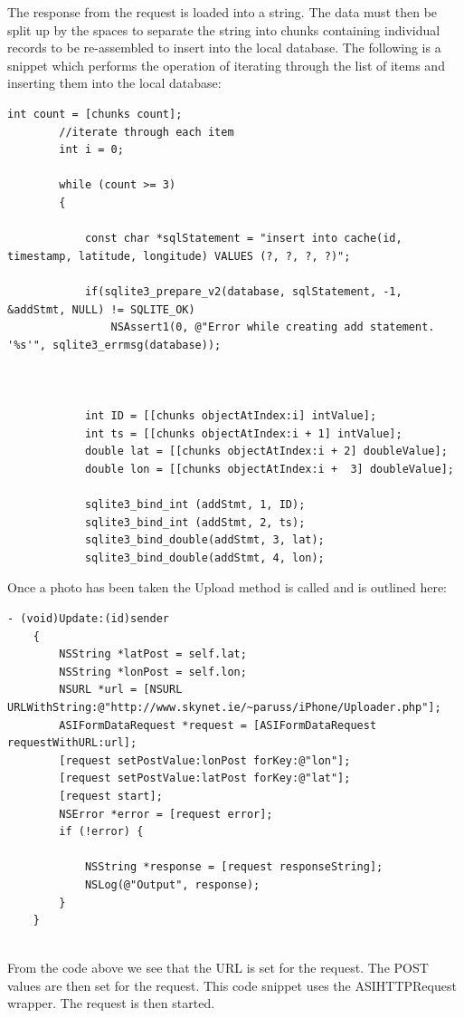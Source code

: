 \documentclass[12pt]{article}
\begin{document}
The response from the request is loaded into a string. The data must then be split up by the spaces to separate the string into chunks containing individual records to be re-assembled to insert into the local database. The following is a snippet which performs the operation of iterating through the list of items and inserting them into the local database:
\begin{verbatim}
int count = [chunks count];
		//iterate through each item 
		int i = 0;
		
		while (count >= 3)
		{
			
			const char *sqlStatement = "insert into cache(id, timestamp, latitude, longitude) VALUES (?, ?, ?, ?)";
			
			if(sqlite3_prepare_v2(database, sqlStatement, -1, &addStmt, NULL) != SQLITE_OK)
				NSAssert1(0, @"Error while creating add statement. '%s'", sqlite3_errmsg(database));
			
			
			
	        int ID = [[chunks objectAtIndex:i] intValue];
			int ts = [[chunks objectAtIndex:i + 1] intValue];
			double lat = [[chunks objectAtIndex:i + 2] doubleValue];
			double lon = [[chunks objectAtIndex:i +  3] doubleValue];
			
			sqlite3_bind_int (addStmt, 1, ID);
			sqlite3_bind_int (addStmt, 2, ts);
			sqlite3_bind_double(addStmt, 3, lat);
			sqlite3_bind_double(addStmt, 4, lon);

\end{verbatim}

Once a photo has been taken the Upload method is called and is outlined here:

\begin{verbatim}
- (void)Update:(id)sender
	{
		NSString *latPost = self.lat;
		NSString *lonPost = self.lon;
		NSURL *url = [NSURL URLWithString:@"http://www.skynet.ie/~paruss/iPhone/Uploader.php"];
		ASIFormDataRequest *request = [ASIFormDataRequest requestWithURL:url];
		[request setPostValue:lonPost forKey:@"lon"];
		[request setPostValue:latPost forKey:@"lat"];
		[request start]; 
		NSError *error = [request error];
		if (!error) {
			
			NSString *response = [request responseString];
			NSLog(@"Output", response);
		}
	}


\end{verbatim}

From the code above we see that the URL is set for the request. The POST values are then set for the request. This code snippet uses the ASIHTTPRequest wrapper. The request is then started.
\end{document}
